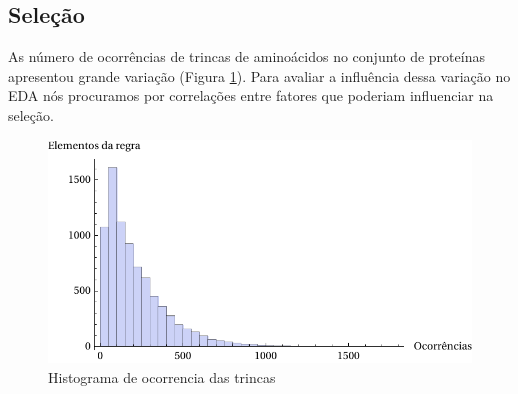 




\subsection{Seleção}

As número de ocorrências de trincas de aminoácidos no conjunto de proteínas apresentou grande variação (Figura \ref{fig:histograma_occ}). Para avaliar a influência dessa variação no EDA nós procuramos por correlações entre fatores que poderiam influenciar na seleção.

\begin{figure}
  \centering
  \includegraphics[width=1\textwidth]{figures/histograma_occ.pdf}
  \caption{Histograma de ocorrencia das trincas}
        \label{fig:histograma_occ}
\end{figure}

